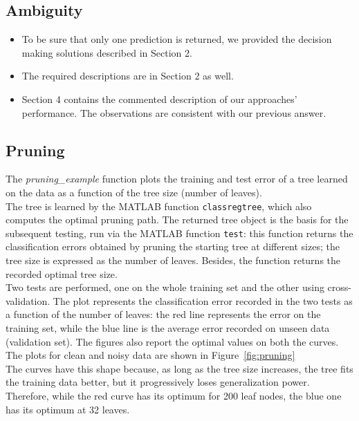 \documentclass{article}
\begin{document}
\subsection{Ambiguity}
\begin{itemize}
	\item To be sure that only one prediction is returned, we provided the decision making solutions described in Section 2.
	\item The required descriptions are in Section 2 as well.
	\item Section 4 contains the commented description of our approaches' performance. The observations are consistent with our previous answer.
\end{itemize}
\subsection{Pruning}
The \emph{pruning\_example} function plots the training and test error of a tree learned on the data as a function of the tree size (number of leaves).\\
The tree is learned by the MATLAB function \verb$classregtree$, which also computes the optimal pruning path. The returned tree object is the basis for the subsequent testing, run via the MATLAB function \verb$test$: this function returns the classification errors obtained by pruning the starting tree at different sizes; the tree size is expressed as the number of leaves. Besides, the function returns the recorded optimal tree size.\\
Two tests are performed, one on the whole training set and the other using cross-validation. 
The plot represents the classification error recorded in the two tests as a function of the number of leaves: the red line represents the error on the training set, while the blue line is the average error recorded on unseen data (validation set). The figures also report the optimal values on both the curves. The plots for clean and noisy data are shown in Figure~\ref{fig:pruning}\\
The curves have this shape because, as long as the tree size increases, the tree fits the training data better, but it progressively loses generalization power. Therefore, while the red curve has its optimum for 200 leaf nodes, the blue one has its optimum at 32 leaves.
\end{document}
